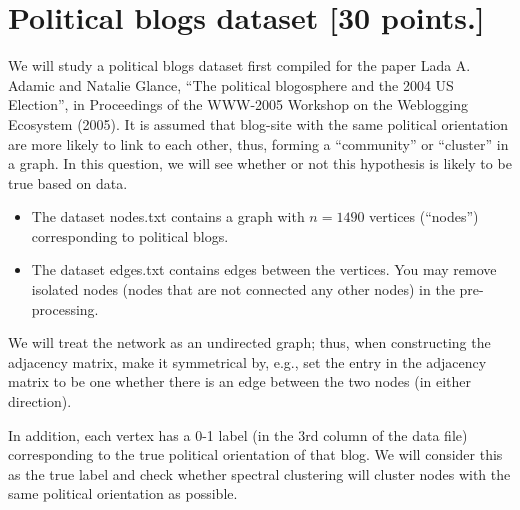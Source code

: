 \documentclass[twoside,10pt]{article}
\begin{document}
\section{Political blogs dataset [30 points.]}

We will study a political blogs dataset first compiled for the paper Lada A. Adamic and Natalie Glance, ``The political blogosphere and the 2004 US Election'', in Proceedings of the WWW-2005 Workshop on the Weblogging Ecosystem (2005). It is assumed that blog-site with the same political orientation are more likely to link to each other, thus, forming a ``community'' or ``cluster'' in a graph. In this question, we will see whether or not this hypothesis is likely to be true based on data.
\begin{itemize}

\item The dataset \textsf{nodes.txt} contains a graph with $n = 1490$ vertices (``nodes'') corresponding to political blogs. 

\item The dataset \textsf{edges.txt} contains edges between the vertices. You may remove isolated nodes (nodes that are not connected any other nodes) in the pre-processing. 

\end{itemize}

We will treat the network as an undirected graph; thus, when constructing the adjacency matrix, make it symmetrical by, e.g., set the entry in the adjacency matrix to be one whether there is an edge between the two nodes (in either direction). 

In addition, each vertex has a 0-1 label (in the 3rd column of the data file) corresponding to the true political orientation of that blog. We will consider this as the true label and check whether spectral clustering will cluster nodes with the same political orientation as possible. 
\end{document}

